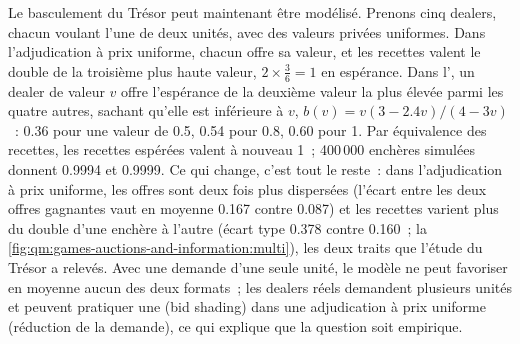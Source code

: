 Le basculement du Trésor peut maintenant être modélisé. Prenons cinq dealers, chacun voulant l'une de deux unités, avec des valeurs privées uniformes. Dans l'adjudication à prix uniforme, chacun offre sa valeur, et les recettes valent le double de la troisième plus haute
valeur, $2 \times \frac36 = 1$ en espérance. Dans l', un dealer de valeur $v$ offre l'espérance de la deuxième valeur la plus élevée parmi les quatre autres, sachant qu'elle est inférieure à $v$, $b(v) = v(3 - 2.4v)/(4 -
3v)$~: 0.36 pour une valeur de 0.5, 0.54 pour 0.8, 0.60 pour 1. Par équivalence des recettes, les recettes espérées valent à nouveau 1~; 400\,000 enchères simulées donnent 0.9994 et 0.9999. Ce qui change, c'est tout le reste~: dans l'adjudication à prix uniforme, les
offres sont deux fois plus dispersées (l'écart entre les deux offres gagnantes vaut en moyenne 0.167 contre 0.087) et les recettes varient plus du double d'une enchère à l'autre (écart type 0.378 contre 0.160~;
la \cref{fig:qm:games-auctions-and-information:multi}), les deux traits que l'étude du Trésor a relevés. Avec une demande d'une seule unité, le modèle ne peut favoriser en moyenne aucun des deux formats~; les dealers réels demandent plusieurs unités et peuvent
pratiquer une  (bid shading) dans une adjudication à prix uniforme (réduction de la demande), ce qui explique que la question soit empirique.

\begin{omfigure}

\label{fig:qm:games-auctions-and-information:multi}
\end{omfigure}


